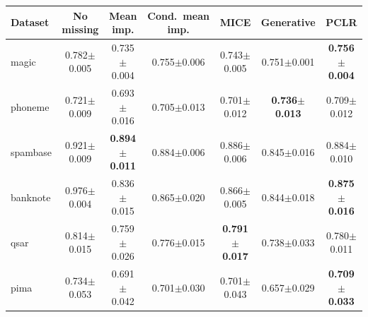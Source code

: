 \begin{tabular}{lcccccc}
\toprule
Dataset & No missing & Mean imp. & Cond.\ mean imp. & MICE & Generative & PCLR \\
\midrule
magic & 0.782{\scriptsize$\pm$0.005} & 0.735{\scriptsize$\pm$0.004} & 0.755{\scriptsize$\pm$0.006} & 0.743{\scriptsize$\pm$0.005} & 0.751{\scriptsize$\pm$0.001} & \textbf{0.756{\scriptsize$\pm$0.004}} \\
phoneme & 0.721{\scriptsize$\pm$0.009} & 0.693{\scriptsize$\pm$0.016} & 0.705{\scriptsize$\pm$0.013} & 0.701{\scriptsize$\pm$0.012} & \textbf{0.736{\scriptsize$\pm$0.013}} & 0.709{\scriptsize$\pm$0.012} \\
spambase & 0.921{\scriptsize$\pm$0.009} & \textbf{0.894{\scriptsize$\pm$0.011}} & 0.884{\scriptsize$\pm$0.006} & 0.886{\scriptsize$\pm$0.006} & 0.845{\scriptsize$\pm$0.016} & 0.884{\scriptsize$\pm$0.010} \\
banknote & 0.976{\scriptsize$\pm$0.004} & 0.836{\scriptsize$\pm$0.015} & 0.865{\scriptsize$\pm$0.020} & 0.866{\scriptsize$\pm$0.005} & 0.844{\scriptsize$\pm$0.018} & \textbf{0.875{\scriptsize$\pm$0.016}} \\
qsar & 0.814{\scriptsize$\pm$0.015} & 0.759{\scriptsize$\pm$0.026} & 0.776{\scriptsize$\pm$0.015} & \textbf{0.791{\scriptsize$\pm$0.017}} & 0.738{\scriptsize$\pm$0.033} & 0.780{\scriptsize$\pm$0.011} \\
pima & 0.734{\scriptsize$\pm$0.053} & 0.691{\scriptsize$\pm$0.042} & 0.701{\scriptsize$\pm$0.030} & 0.701{\scriptsize$\pm$0.043} & 0.657{\scriptsize$\pm$0.029} & \textbf{0.709{\scriptsize$\pm$0.033}} \\
\bottomrule
\end{tabular}
